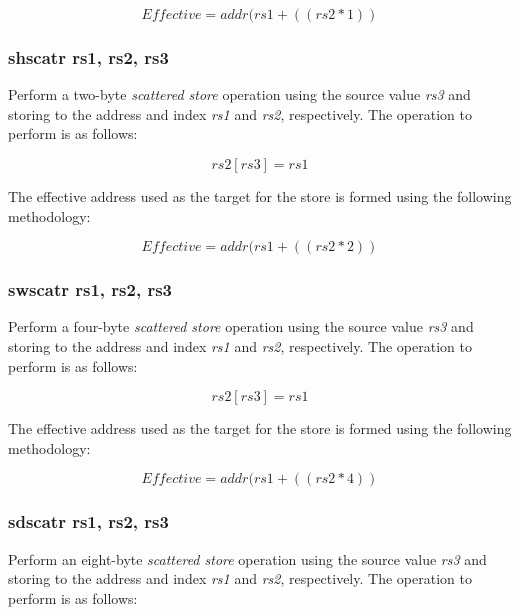 \documentclass{article}
\begin{document}
\begin{equation}
Effective = addr(rs1 + ((rs2 * 1))
\end{equation}

\subsubsection{shscatr rs1, rs2, rs3}

Perform a two-byte \emph{scattered store} operation using the 
source value \emph{rs3} and storing to the address and index
\emph{rs1} and \emph{rs2}, respectively.  The operation to
perform is as follows: 

\begin{equation}
rs2[rs3] = rs1
\end{equation}

The effective address used as the target
for the store is formed using the following methodology:

\begin{equation}
Effective = addr(rs1 + ((rs2 * 2))
\end{equation}

\subsubsection{swscatr rs1, rs2, rs3}

Perform a four-byte \emph{scattered store} operation using the 
source value \emph{rs3} and storing to the address and index
\emph{rs1} and \emph{rs2}, respectively.  The operation to
perform is as follows: 

\begin{equation}
rs2[rs3] = rs1
\end{equation}

The effective address used as the target
for the store is formed using the following methodology:

\begin{equation}
Effective = addr(rs1 + ((rs2 * 4))
\end{equation}

\subsubsection{sdscatr rs1, rs2, rs3}

Perform an eight-byte \emph{scattered store} operation using the 
source value \emph{rs3} and storing to the address and index
\emph{rs1} and \emph{rs2}, respectively.  The operation to
perform is as follows: 
\end{document}
